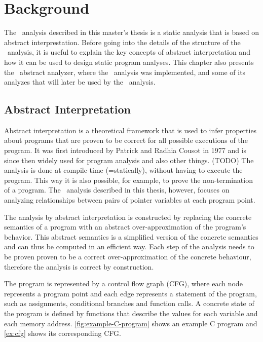 \chapter{Background}

The \cpo\ analysis described in this master's thesis is a static analysis that is based on abstract interprestation.
Before going into the details of the structure of the \cpo\ analysis,
it is useful to explain the key concepts of abstract interpretation and how it can be used
to design static program analyses.
This chapter also presents the \goblint\ abstract analyzer, where the \cpo\ analysis was implemented, and some of its analyzes that will later be
used by the \cpo\ analysis.

\section{Abstract Interpretation}

Abstract interpretation is a theoretical framework that is used to infer properties about programs
that are proven to be correct for all possible executions of the program.
It was first introduced by Patrick and Radhia Cousot in 1977 \cite{TODO} and is since then widely used
for program analysis and also other things. (TODO)
The analysis is done at compile-time (=statically), without having to execute the program.
This way it is also possible, for example, to prove the non-termination of a program.
The \cpo\ analysis described in this thesis, however, focuses on analyzing
relationships between pairs of pointer variables at each program point.

The analysis by abstract interpretation is constructed by replacing the concrete
semantics of a program with an abstract over-approximation of the program's behavior.
This abstract semantics is a simplified version of the concrete semantics
and can thus be computed in an efficient way.
Each step of the analysis needs to be proven proven to be a correct over-approximation of the concrete behaviour,
therefore the analysis is correct by construction.

The program is represented by a control flow graph (CFG), where each node represents a program point and each edge represents a statement of the program, such as assignments, conditional branches and function calls.
A concrete state of the program is defined by functions that describe the values for each variable and each memory address.
\cref{fig:example-C-program} shows an example C program and \cref{ex:cfg} shows its corresponding CFG.

